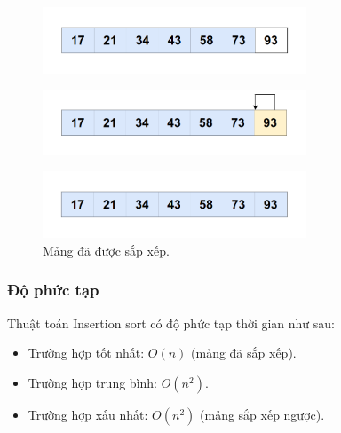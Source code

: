\begin{itemize}
    \begin{figure}[H]
        \centering
        \includegraphics[width=0.7\textwidth]{img/insertion sort_lan2/11.png}
    \end{figure}

    \begin{figure}[H]
        \centering
        \includegraphics[width=0.7\textwidth]{img/insertion sort_lan2/12.png}
    \end{figure}

    \begin{figure}[H]
        \centering
        \includegraphics[width=0.7\textwidth]{img/insertion sort_lan2/13.png}
        \caption{Mảng đã được sắp xếp.}
    \end{figure}
\end{itemize}




\subsubsection{Độ phức tạp}
Thuật toán Insertion sort có độ phức tạp thời gian như sau:
\begin{itemize}
    \item Trường hợp tốt nhất: $O(n)$ (mảng đã sắp xếp).
    \item Trường hợp trung bình: $O(n^2)$.
    \item Trường hợp xấu nhất: $O(n^2)$ (mảng sắp xếp ngược).
\end{itemize}
